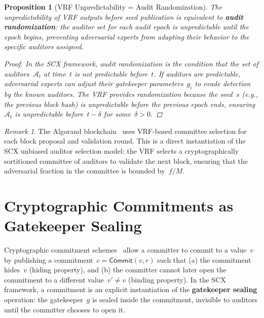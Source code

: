 \documentclass[12pt,a4paper]{article}
\newtheorem{proposition}[theorem]{Proposition}
\theoremstyle{remark}
\newtheorem{remark}[theorem]{Remark}
\newcommand{\A}{\mathcal{A}}
\newcommand{\SCX}{\textsf{SCX}}
\newcommand{\Commit}{\textsf{Commit}}
\begin{document}
\begin{proposition}[VRF Unpredictability = Audit Randomization]
\label{prop:vrf_randomization}
The unpredictability of VRF outputs before seed publication is equivalent to \textbf{audit randomization}: the auditor set for each audit epoch is unpredictable until the epoch begins, preventing adversarial experts from adapting their behavior to the specific auditors assigned.

\begin{proof}
In the \SCX{} framework, audit randomization is the condition that the set of auditors~$\A_t$ at time~$t$ is not predictable before~$t$. If auditors are predictable, adversarial experts can adjust their gatekeeper parameters~$g_i$ to evade detection by the known auditors. The VRF provides randomization because the seed~$s$ (e.g., the previous block hash) is unpredictable before the previous epoch ends, ensuring~$\A_t$ is unpredictable before~$t-\delta$ for some~$\delta > 0$.
\end{proof}
\end{proposition}

\begin{remark}
\label{rem:vrf_algorand}
The Algorand blockchain~\cite{gilad2017algorand} uses VRF-based committee selection for each block proposal and validation round. This is a direct instantiation of the \SCX{} unbiased auditor selection model: the VRF selects a cryptographically sortitioned committee of auditors to validate the next block, ensuring that the adversarial fraction in the committee is bounded by~$f/M$.
\end{remark}


\section{Cryptographic Commitments as Gatekeeper Sealing}
\label{sec:commitments}

Cryptographic commitment schemes~\cite{blum1984coin} allow a committer to commit to a value~$v$ by publishing a commitment~$c = \Commit(v, r)$ such that (a) the commitment hides~$v$ (hiding property), and (b) the committer cannot later open the commitment to a different value~$v' \neq v$ (binding property). In the \SCX{} framework, a commitment is an explicit instantiation of the \textbf{gatekeeper sealing} operation: the gatekeeper~$g$ is sealed inside the commitment, invisible to auditors until the committer chooses to open it.
\end{document}
